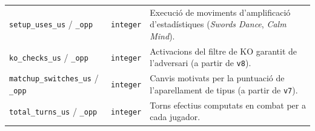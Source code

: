 \begin{table}[htbp]
\begin{tabularx}{\textwidth}{lp{1.8cm}>{\raggedright\arraybackslash}X}
\texttt{setup\_uses\_us} / \texttt{\_opp} & \texttt{integer} & Execució de moviments d'amplificació d'estadístiques (\emph{Swords Dance}, \emph{Calm Mind}). \\
\texttt{ko\_checks\_us} / \texttt{\_opp} & \texttt{integer} & Activacions del filtre de KO garantit de l'adversari (a partir de \texttt{v8}). \\
\texttt{matchup\_switches\_us} / \texttt{\_opp} & \texttt{integer} & Canvis motivats per la puntuació de l'aparellament de tipus (a partir de \texttt{v7}). \\
\texttt{total\_turns\_us} / \texttt{\_opp} & \texttt{integer} & Torns efectius computats en combat per a cada jugador. \\
\bottomrule
\end{tabularx}
\end{table}

